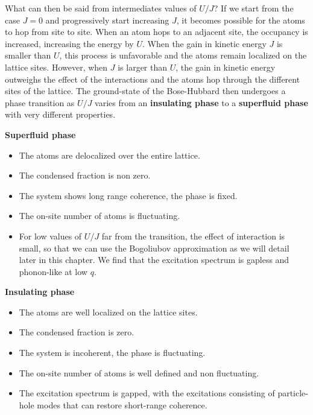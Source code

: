 What can then be said from intermediates values of $U/J$? If we start from the case $J=0$ and progressively start increasing $J$, it becomes possible for the atoms to hop from site to site. When an atom hops to an adjacent site, the occupancy is increased, increasing the energy by $U$. When the gain in kinetic energy $J$ is smaller than $U$, this process is unfavorable and the atoms remain localized on the lattice sites. However, when $J$ is larger than $U$, the gain in kinetic energy outweighs the effect of the interactions and the atoms hop through the different sites of the lattice. The ground-state of the Bose-Hubbard then undergoes a phase transition as $U/J$ varies from an \textbf{insulating phase} to a \textbf{superfluid phase} with very different properties.

\begin{minipage}[t]{0.45\textwidth}
    \noindent \textbf{Superfluid phase}
    \begin{itemize}
        \item The atoms are delocalized over the entire lattice.
        \item The condensed fraction is non zero.
        \item The system shows long range coherence, \ie the phase is fixed.
        \item The on-site number of atoms is fluctuating.
        \item For low values of $U/J$ far from the transition, the effect of interaction is small, so that we can use the Bogoliubov approximation as we will detail later in this chapter. We find that the excitation spectrum is gapless and phonon-like at low $q$.
    \end{itemize}
\end{minipage}
\begin{minipage}[t]{0.48\textwidth}
    \noindent \textbf{Insulating phase}
    \begin{itemize}
        \item The atoms are well localized on the lattice sites.
        \item The condensed fraction is zero.
        \item The system is incoherent, the phase is fluctuating.
        \item The on-site number of atoms is well defined and non fluctuating.
        \item The excitation spectrum is gapped, with the excitations consisting of particle-hole modes that can restore short-range coherence. 
    \end{itemize}
\end{minipage}

